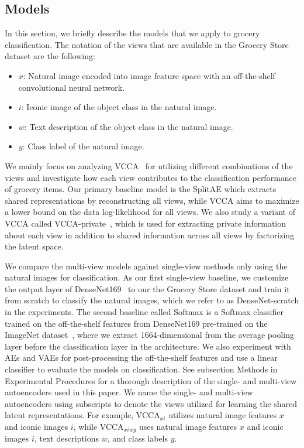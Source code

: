 \subsection{Models}

In this section, we briefly describe the models that we apply to grocery classification. The notation of the views that are available in the Grocery Store dataset are the following:
\begin{itemize}
    \item $x$: Natural image encoded into image feature space with an off-the-shelf convolutional neural network.
    \item $i$: Iconic image of the object class in the natural image.
    \item $w$: Text description of the object class in the natural image.
    \item $y$: Class label of the natural image.
\end{itemize}
We mainly focus on analyzing VCCA~\cite{wang2016deep} for utilizing different combinations of the views and investigate how each view contributes to the classification performance of grocery items. Our primary baseline model is the SplitAE which extracts shared representations by reconstructing all views, while VCCA aims to maximize a lower bound on the data log-likelihood for all views. We also study a variant of VCCA called VCCA-private~\cite{wang2016deep}, which is used for extracting private information about each view in addition to shared information across all views by factorizing the latent space. 

We compare the multi-view models against single-view methods only using the natural images for classification. As our first single-view baseline, we customize the output layer of DenseNet169~\cite{huang2017densely} to our the Grocery Store dataset and train it from scratch to classify the natural images, which we refer to as DenseNet-scratch in the experiments. The second baseline called Softmax is a Softmax classifier trained on the off-the-shelf features from DenseNet169 pre-trained on the ImageNet dataset~\cite{deng2009imagenet}, where we extract 1664-dimensional from the average pooling layer before the classification layer in the architecture. We also experiment with AEs and VAEs for post-processing the off-the-shelf features and use a linear classifier to evaluate the models on classification. See subsection Methods in Experimental Procedures
for a thorough description of the single- and multi-view autoencoders used in this paper. We name the single- and multi-view autoencoders using subscripts to denote the views utilized for learning the shared latent representations. For example, VCCA$_{x i}$ utilizes natural image features $x$ and iconic images $i$, while VCCA$_{x i w y}$ uses natural image features $x$ and iconic images $i$, text descriptions $w$, and class labels $y$.


